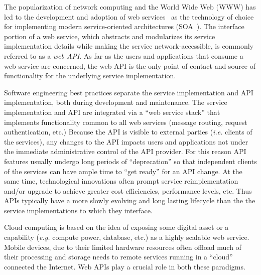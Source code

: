 
The popularization of network computing and the World Wide Web (WWW) 
has led to the development and adoption of web services~\cite{6094008} as
the technology of choice for implementing modern service-oriented 
architectures (SOA~\cite{Haines:2010:SAM:1787234.1787269}).
The
interface portion of a web service, which abstracts and modularizes
its service implementation
details while making the service network-accessible, is commonly referred to
as a {\em web API}. As far as the users and applications that consume a 
web service
are concerned, the web API is the only point of contact and source of
functionality for the underlying service implementation.

Software engineering best practices separate the service implementation
and API implementation, both during development and maintenance.
The service implementation and API are integrated via 
a ``web service stack'' that implements functionality common to all web
services (message routing, request authentication, etc.)
Because the API is visible to external parties ({\em i.e.} clients of the
services), any changes to the API
impacts users and applications not under the immediate administrative control
of the API provider.  For this reason API features 
usually undergo long
periods of ``deprecation'' so that independent clients of the services can have
ample time to ``get ready'' for an API change.  At the same time,
technological innovations often prompt service reimplementation and/or 
upgrade to
achieve greater cost efficiencies, performance levels, etc.
Thus APIs typically have a more
slowly evolving and long lasting lifecycle than the the service
implementations
to which they interface. 

Cloud computing is based on the idea of exposing some digital asset or a
capability ({\em e.g.} compute power, database, etc.) 
as a highly scalable web service.  Mobile
devices, due to their limited hardware resources often offload much of their
processing and storage needs to remote services running in a ``cloud''
connected the Internet.  Web APIs
play a crucial role in both these paradigms. 

